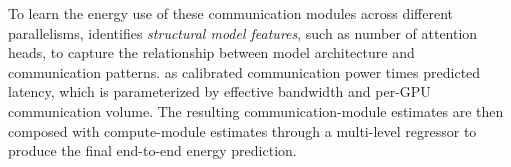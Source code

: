 To learn the energy use of these communication modules across different parallelisms, \sys{} identifies \emph{structural model features}, such as number of attention heads, to capture the relationship between model architecture and communication patterns.
%
\sys{}  as calibrated communication power times predicted latency, which is parameterized by effective bandwidth and per-GPU communication volume.
The resulting communication-module estimates are then composed with compute-module estimates through a multi-level regressor to produce the final end-to-end energy prediction.


